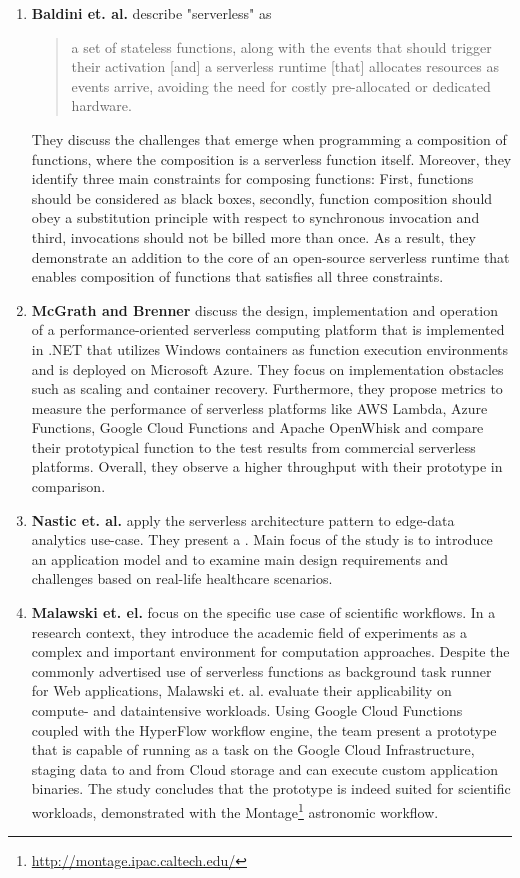 \begin{enumerate}
    \item 
        \textbf{Baldini et. al.} describe "serverless" as \blockquote{a set of stateless functions, along with the events that should trigger their activation [and] a serverless runtime [that] allocates resources as events arrive, avoiding the need for costly pre-allocated or dedicated hardware.} They discuss the challenges that emerge when programming a composition of functions, where the composition is a serverless function itself. Moreover, they identify three main constraints for composing functions: First, functions should be considered as black boxes, secondly, function composition should obey a substitution principle with respect to synchronous invocation and third,  invocations should not be billed more than once. As a result, they demonstrate an addition to the core of an open-source serverless runtime that enables composition of functions that satisfies all three constraints.~
    \item
        \textbf{McGrath and Brenner} discuss the design, implementation and operation of a performance-oriented serverless computing platform that is implemented in .NET that utilizes Windows containers as function execution environments and is deployed on Microsoft Azure. They focus on implementation obstacles such as scaling and container recovery. Furthermore, they propose metrics to measure the performance of serverless platforms like AWS Lambda, Azure Functions, Google Cloud Functions and Apache OpenWhisk and compare their prototypical function to the test results from commercial serverless platforms. Overall, they observe a higher throughput with their prototype in comparison.~
    \item 
        \textbf{Nastic et. al.} apply the serverless architecture pattern to edge-data analytics use-case. They present a . Main focus of the study is to introduce an application model and to examine main design requirements and challenges based on real-life healthcare scenarios.~
    \item 
        \textbf{Malawski et. el.} focus on the specific use case of scientific workflows. In a research context, they introduce the academic field of experiments as a complex and important environment for computation approaches. Despite the commonly advertised use of serverless functions as background task runner for Web applications, Malawski et. al. evaluate their applicability on compute- and dataintensive workloads. Using Google Cloud Functions coupled with the HyperFlow workflow engine, the team present a prototype that is capable of running as a task on the Google Cloud Infrastructure, staging data to and from Cloud storage and can execute custom application binaries. The study concludes that the prototype is indeed suited for scientific workloads, demonstrated with the Montage\footnote{\url{http://montage.ipac.caltech.edu/}} astronomic workflow.~

\end{enumerate}
